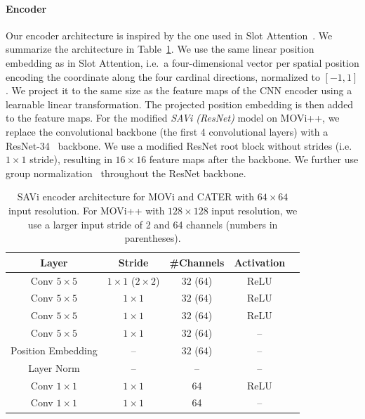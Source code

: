 \documentclass{article}
\begin{document}
\paragraph{Encoder}
Our encoder architecture is inspired by the one used in Slot Attention~\citep{locatello2020object}. We summarize the architecture in Table~\ref{table:architecture_cnn_enc}. We use the same linear position embedding as in Slot Attention, i.e.~a four-dimensional vector per spatial position encoding the coordinate along the four cardinal directions, normalized to $[-1, 1]$. We project it to the same size as the feature maps of the CNN encoder using a learnable linear transformation. The projected position embedding is then added to the feature maps. For the modified \textit{SAVi (ResNet)} model on MOVi++, we replace the convolutional backbone (the first 4 convolutional layers) with a ResNet-34~\citep{he2016deep} backbone. We use a modified ResNet root block without strides (i.e. $1\times1$ stride), resulting in $16\times16$ feature maps after the backbone. We further use group normalization~\citep{wu2018group} throughout the ResNet backbone.
\begin{table}[htp!]
\centering
\caption{SAVi encoder architecture for MOVi and CATER with $64\times64$ input resolution. For MOVi++ with $128\times128$ input resolution, we use a larger input stride of 2 and 64 channels (numbers in parentheses).}
\begin{tabular}{ccccc}
\toprule
Layer & Stride & \#Channels & Activation \\
\midrule 
Conv $5\times 5$ & $1\times 1$ ($2\times 2$) & $32$ ($64$) & ReLU\\
Conv  $5\times 5$ & $1\times 1$ & $32$ ($64$) & ReLU\\
Conv $5\times 5$ & $1\times 1$ & $32$ ($64$) & ReLU\\
Conv  $5\times 5$ & $1\times 1$ & $32$ ($64$) & --\\
Position Embedding & -- & $32$ ($64$) & --\\
Layer Norm & -- & -- & --  \\ 
Conv $1\times 1$ & $1\times 1$ & 64 & ReLU \\ 
Conv $1\times 1$ & $1\times 1$ & 64 & -- \\ 
\bottomrule
\end{tabular}
\label{table:architecture_cnn_enc}
\end{table}
\end{document}
